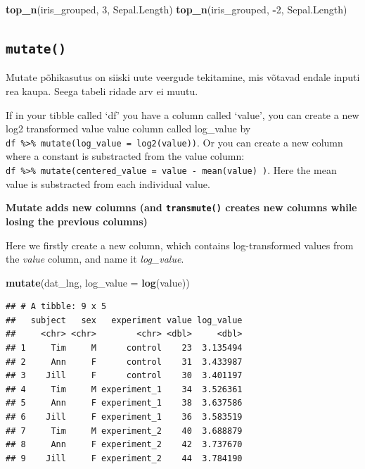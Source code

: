 \documentclass[]{book}
\newenvironment{Shaded}{\begin{snugshade}}{\end{snugshade}}
\newcommand{\KeywordTok}[1]{\textcolor[rgb]{0.13,0.29,0.53}{\textbf{#1}}}
\newcommand{\DataTypeTok}[1]{\textcolor[rgb]{0.13,0.29,0.53}{#1}}
\newcommand{\DecValTok}[1]{\textcolor[rgb]{0.00,0.00,0.81}{#1}}
\newcommand{\OperatorTok}[1]{\textcolor[rgb]{0.81,0.36,0.00}{\textbf{#1}}}
\newcommand{\NormalTok}[1]{#1}
\begin{document}
\begin{Shaded}
\begin{Highlighting}[]
\KeywordTok{top_n}\NormalTok{(iris_grouped, }\DecValTok{3}\NormalTok{, Sepal.Length)}
\KeywordTok{top_n}\NormalTok{(iris_grouped, }\OperatorTok{-}\DecValTok{2}\NormalTok{, Sepal.Length)}
\end{Highlighting}
\end{Shaded}

\subsection{\texorpdfstring{\texttt{mutate()}}{mutate()}}\label{mutate}

Mutate põhikasutus on siiski uute veergude tekitamine, mis võtavad
endale inputi rea kaupa. Seega tabeli ridade arv ei muutu.

If in your tibble called `df' you have a column called `value', you can
create a new log2 transformed value value column called log\_value by
\texttt{df\ \%\textgreater{}\%\ mutate(log\_value\ =\ log2(value))}. Or
you can create a new column where a constant is substracted from the
value column:
\texttt{df\ \%\textgreater{}\%\ mutate(centered\_value\ =\ value\ -\ mean(value)\ )}.
Here the mean value is substracted from each individual value.

\textbf{Mutate adds new columns (and \texttt{transmute()} creates new
columns while losing the previous columns)}

Here we firstly create a new column, which contains log-transformed
values from the \emph{value} column, and name it \emph{log\_value}.

\begin{Shaded}
\begin{Highlighting}[]
\KeywordTok{mutate}\NormalTok{(dat_lng, }\DataTypeTok{log_value =} \KeywordTok{log}\NormalTok{(value))}
\end{Highlighting}
\end{Shaded}

\begin{verbatim}
## # A tibble: 9 x 5
##   subject   sex   experiment value log_value
##     <chr> <chr>        <chr> <dbl>     <dbl>
## 1     Tim     M      control    23  3.135494
## 2     Ann     F      control    31  3.433987
## 3    Jill     F      control    30  3.401197
## 4     Tim     M experiment_1    34  3.526361
## 5     Ann     F experiment_1    38  3.637586
## 6    Jill     F experiment_1    36  3.583519
## 7     Tim     M experiment_2    40  3.688879
## 8     Ann     F experiment_2    42  3.737670
## 9    Jill     F experiment_2    44  3.784190
\end{verbatim}
\end{document}
